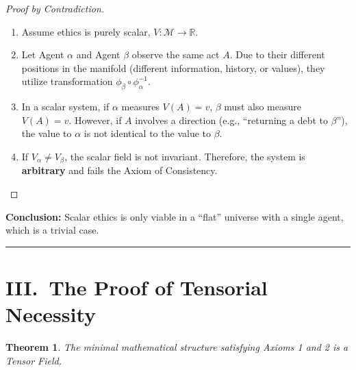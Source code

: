 \documentclass[12pt]{article}
\newtheorem{theorem}{Theorem}
\theoremstyle{remark}
\begin{document}
\begin{proof}[Proof by Contradiction]
\begin{enumerate}
    \item Assume ethics is purely scalar, $V : \mathcal{M} \to \mathbb{R}$.

    \item Let Agent $\alpha$ and Agent $\beta$ observe the same act $A$. Due to
    their different positions in the manifold (different information, history, or
    values), they utilize transformation $\phi_\beta \circ \phi_\alpha^{-1}$.

    \item In a scalar system, if $\alpha$ measures $V(A) = v$, $\beta$ must
    also measure $V(A) = v$. However, if $A$ involves a direction (e.g.,
    ``returning a debt to $\beta$''), the value to $\alpha$ is not identical to
    the value to $\beta$.

    \item If $V_\alpha \neq V_\beta$, the scalar field is not invariant.
    Therefore, the system is \textbf{arbitrary} and fails the Axiom of
    Consistency.
\end{enumerate}
\end{proof}

\noindent\textbf{Conclusion:} Scalar ethics is only viable in a ``flat''
universe with a single agent, which is a trivial case.

\bigskip
\hrule
\bigskip

\section*{III.\ The Proof of Tensorial Necessity}

\begin{theorem}
The minimal mathematical structure satisfying Axioms 1 and 2 is a Tensor Field.
\end{theorem}
\end{document}
